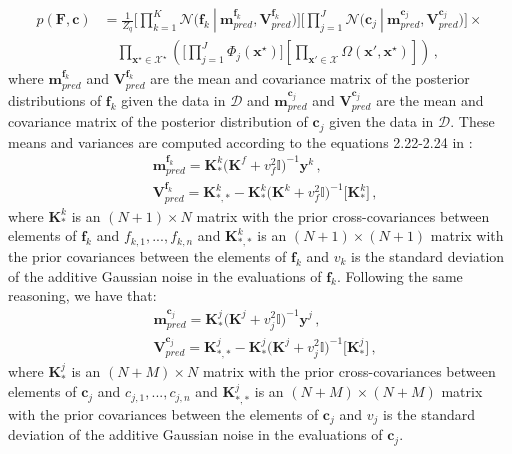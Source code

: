 \begin{align}
p(\boldsymbol{F},\boldsymbol{c}) & = \frac{1}{Z_q} \bigg[\prod_{k=1}^{K}\mathcal{N}\big(\boldsymbol{f}_k\ |\  \boldsymbol{m}_{pred}^{\boldsymbol{f}_k}, \boldsymbol{V}_{pred}^{\boldsymbol{f}_k}\big)\bigg] \bigg[\prod_{j=1}^{J}\mathcal{N}\big(\boldsymbol{c}_j\ |\  \boldsymbol{m}_{pred}^{\boldsymbol{c}_j}, \boldsymbol{V}_{pred}^{\boldsymbol{c}_j}\big)\bigg] \times \nonumber
\\
        & \quad \prod_{\textbf{x}^\star\in \mathcal{X}^\star} 
        \left(
        \Bigg[\prod_{j=1}^{J}\Phi_j(\textbf{x}^{\star})\Bigg]
        \left[ 
        \prod_{\textbf{x}'\in \mathcal{X}} 
        \Omega(\textbf{x}',\textbf{x}^{\star})
        \right] 
        \right)\,,
        \label{eq:target}
\end{align}
where $\boldsymbol{m}_{pred}^{\boldsymbol{f}_k}$ and $\boldsymbol{V}_{pred}^{\boldsymbol{f}_k}$ are the mean and covariance matrix of the posterior distributions of $\boldsymbol{f}_k$ given the data in $\mathcal{D}$ and $\boldsymbol{m}_{pred}^{\boldsymbol{c}_j}$ and $\boldsymbol{V}_{pred}^{\boldsymbol{c}_j}$ are the mean and covariance matrix of the posterior distribution of $\boldsymbol{c}_j$ given the data in $\mathcal{D}$. These means and variances are computed according to the equations 2.22-2.24 in \citep{rasmussen2003gaussian}:
\begin{align}
    &
    \boldsymbol{m}_{pred}^{\boldsymbol{f}_{k}} = \boldsymbol{K}_{*}^{k}\big(\boldsymbol{K}^{f} + v_{f}^{2}        \mathds{I}\big)^{-1}\boldsymbol{y}^k\,, \nonumber \\
    & 
    \boldsymbol{V}_{pred}^{\boldsymbol{f}_{k}} = \boldsymbol{K}_{*,*}^{k} - \boldsymbol{K}_{*}^{k}\big(\boldsymbol{K}^{k} + v_{f}^{2}        \mathds{I}\big)^{-1}\big[\boldsymbol{K}_{*}^{k}\big]\,,
\end{align}
where $\boldsymbol{K}_{*}^{k}$ is an $(N + 1) \times N$ matrix with the prior cross-covariances between elements of $\boldsymbol{f}_k$ and $f_{k,1},...,f_{k,n}$ and $\boldsymbol{K}_{*,*}^{k}$ is an $(N + 1) \times (N + 1)$ matrix with the prior covariances between the elements of $\boldsymbol{f}_k$ and $v_k$ is the standard deviation of the additive Gaussian noise in the evaluations of $\boldsymbol{f}_k$. Following the same reasoning, we have that:
\begin{align}
    &
    \boldsymbol{m}_{pred}^{\boldsymbol{c}_{j}} = \boldsymbol{K}_{*}^{j}\big(\boldsymbol{K}^{j} + v_{j}^{2}        \mathds{I}\big)^{-1}\boldsymbol{y}^j\,, \nonumber \\
    & 
    \boldsymbol{V}_{pred}^{\boldsymbol{c}_{j}} = \boldsymbol{K}_{*,*}^{j} - \boldsymbol{K}_{*}^{j}\big(\boldsymbol{K}^{j} + v_{j}^{2}        \mathds{I}\big)^{-1}\big[\boldsymbol{K}_{*}^{j}\big]\,,
\end{align}
where $\boldsymbol{K}_{*}^{j}$ is an $(N + M) \times N$ matrix with the prior cross-covariances between elements of $\boldsymbol{c}_j$ and $c_{j,1},...,c_{j,n}$ and $\boldsymbol{K}_{*,*}^{j}$ is an $(N + M) \times (N + M)$ matrix with the prior covariances between the elements of $\boldsymbol{c}_j$ and $v_j$ is the standard deviation of the additive Gaussian noise in the evaluations of $\boldsymbol{c}_j$.

